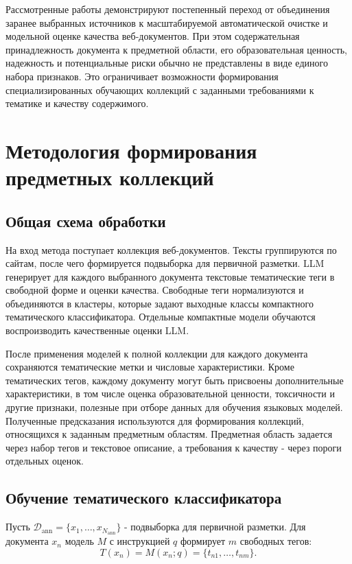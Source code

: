 \documentclass[12pt,a4paper]{article}
\begin{document}
Рассмотренные работы демонстрируют постепенный переход от объединения заранее выбранных источников
к масштабируемой автоматической очистке и модельной оценке качества веб-документов.
При этом содержательная принадлежность документа к предметной области, его образовательная ценность,
надежность и потенциальные риски обычно не представлены в виде единого набора признаков.
Это ограничивает возможности формирования специализированных обучающих коллекций
с заданными требованиями к тематике и качеству содержимого.


\section{Методология формирования предметных коллекций}

\subsection{Общая схема обработки}

На вход метода поступает коллекция веб-документов. Тексты группируются по сайтам,
после чего формируется подвыборка для первичной разметки.
LLM генерирует для каждого выбранного документа текстовые тематические теги в свободной форме и оценки качества.
Свободные теги нормализуются и объединяются в кластеры, которые задают выходные классы компактного тематического классификатора.
Отдельные компактные модели обучаются воспроизводить качественные оценки LLM.

После применения моделей к полной коллекции для каждого документа сохраняются тематические метки
и числовые характеристики. 
Кроме тематических тегов, каждому документу могут быть присвоены дополнительные характеристики, 
в том числе оценка образовательной ценности, токсичности и другие признаки, полезные при отборе данных для обучения языковых моделей.
Полученные предсказания используются для формирования коллекций, относящихся к заданным предметным областям. 
Предметная область задается через набор тегов и текстовое описание,
а требования к качеству - через пороги отдельных оценок.

\subsection{Обучение тематического классификатора}

Пусть $\mathcal{D}_{\mathrm{ann}}=\{x_1,\ldots,x_{N_{\mathrm{ann}}}\}$ -
подвыборка для первичной разметки. Для документа $x_n$ модель $M$ с инструкцией $q$
формирует $m$ свободных тегов:
\begin{equation}
T(x_n)=M(x_n;q)=\{t_{n1},\ldots,t_{nm}\}.
\end{equation}
\end{document}
